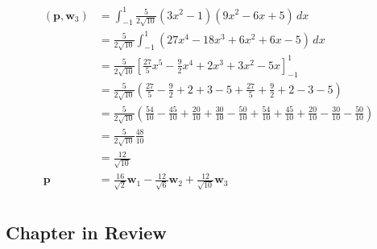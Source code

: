 \documentclass{article}
\begin{document}
\begin{align*}
  (\mathbf{p}, \mathbf{w}_3) & = \int_{-1}^1 \frac{5}{2 \sqrt{10}} (3 x^2 - 1) (9 x^2 - 6 x + 5) \,dx                                                                                                                               \\
                             & = \frac{5}{2 \sqrt{10}} \int_{-1}^1 (27 x^4 - 18 x^3 + 6 x^2 + 6 x - 5) \,dx                                                                                                                         \\
                             & = \frac{5}{2 \sqrt{10}} \left[ \frac{27}{5} x^5 - \frac{9}{2} x^4 + 2 x^3 + 3 x^2 - 5 x \right]_{-1}^1                                                                                               \\
                             & = \frac{5}{2 \sqrt{10}} \left( \frac{27}{5} - \frac{9}{2} + 2 + 3 - 5 + \frac{27}{5} + \frac{9}{2} + 2 - 3 - 5 \right)                                                                               \\
                             & = \frac{5}{2 \sqrt{10}} \left( \frac{54}{10} - \frac{45}{10} + \frac{20}{10} + \frac{30}{10} - \frac{50}{10} + \frac{54}{10} + \frac{45}{10} + \frac{20}{10} - \frac{30}{10} - \frac{50}{10} \right) \\
                             & = \frac{5}{2 \sqrt{10}} \frac{48}{10}                                                                                                                                                                \\
                             & = \frac{12}{\sqrt{10}}                                                                                                                                                                               \\
  \mathbf{p}                 & = \frac{16}{\sqrt{2}} \mathbf{w}_1 - \frac{12}{\sqrt{6}} \mathbf{w}_2 + \frac{12}{\sqrt{10}} \mathbf{w}_3                                                                                            \\
\end{align*}

\subsection{Chapter in Review}

\subsubsection{}
\end{document}
